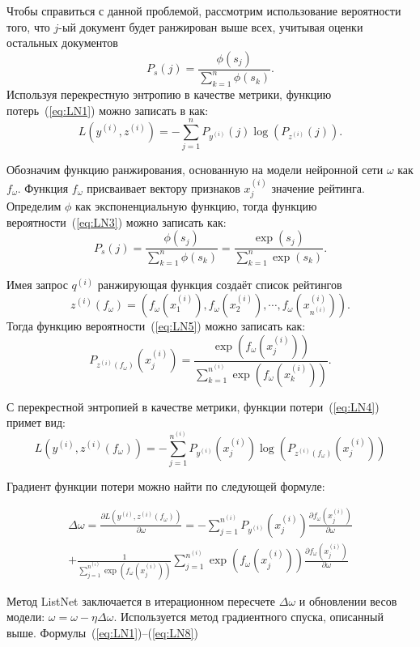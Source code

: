 Чтобы справиться с данной проблемой, рассмотрим использование вероятности того, что $j$-ый документ будет ранжирован выше всех, учитывая оценки остальных документов
\begin{equation}
	\label{eq:LN3}
	P_s(j)=\frac{\phi(s_j)}{\sum_{k=1}^n \phi(s_k)} .
\end{equation}
Используя перекрестную энтропию в качестве метрики, функцию потерь~(\ref{eq:LN1}) можно записать в как:
\begin{equation}
	\label{eq:LN4}
	L(y^{(i)}, z^{(i)})=-\sum_{j=1}^n P_{y^{(i)}}(j) \log (P_{z^{(i)}}(j)).
\end{equation}

Обозначим функцию ранжирования, основанную на модели нейронной сети $\omega$ как $f_\omega$. Функция $f_\omega$ присваивает вектору признаков $x_j^{(i)}$ значение рейтинга. Определим $\phi$ как экспоненциальную функцию, тогда функцию вероятности~(\ref{eq:LN3}) можно записать как:
\begin{equation}
	\label{eq:LN5}
	P_s(j)=\frac{\phi(s_j)}{\sum_{k=1}^n \phi(s_k)}=\frac{\exp (s_j)}{\sum_{k=1}^n \exp (s_k)}.
\end{equation}

Имея запрос $q^{(i)}$ ранжирующая функция создаёт список рейтингов \[z^{(i)}(f_\omega)=(f_\omega(x_1^{(i)}), f_\omega(x_2^{(i)}), \cdots, f_\omega(x_{n^{(i)}}^{(i)})).
\]
Тогда функцию вероятности~(\ref{eq:LN5}) можно записать как:
\begin{equation}
	\label{eq:LN6}
	P_{z^{(i)}(f_\omega)}(x_j^{(i)})=\frac{\exp (f_\omega(x_j^{(i)}))}{\sum_{k=1}^{n^{(i)}} \exp (f_\omega(x_k^{(i)}))}.
\end{equation}

С перекрестной энтропией в качестве метрики, функции потери~(\ref{eq:LN4}) примет вид:
\begin{equation}
	\label{eq:LN7}
	L(y^{(i)}, z^{(i)}(f_\omega))=-\sum_{j=1}^{n^{(i)}} P_{y^{(i)}}(x_j^{(i)}) \log (P_{z^{(i)}(f_\omega)}(x_j^{(i)}))
\end{equation}

Градиент функции потери можно найти по следующей формуле:

\begin{equation}
	\label{eq:LN8}
	\begin{aligned}
		\Delta \omega= 
		\frac{\partial L(y^{(i)}, z^{(i)}(f_\omega))}{\partial \omega}=-\sum_{j=1}^{n^{(i)}} P_{y^{(i)}}(x_j^{(i)}) \frac{\partial f_\omega(x_j^{(i)})}{\partial \omega} \\
		+\frac{1}{\sum_{j=1}^{n^{(i)}} \exp (f_\omega(x_j^{(i)}))} \sum_{j=1}^{n^{(i)}} \exp (f_\omega(x_j^{(i)})) \frac{\partial f_\omega(x_j^{(i)})}{\partial \omega}
	\end{aligned}
\end{equation}


Метод ListNet заключается в итерационном пересчете $\Delta \omega$ и обновлении весов модели: $\omega = \omega - \eta\Delta \omega$. Используется метод градиентного спуска, описанный выше. Формулы~(\ref{eq:LN1})--(\ref{eq:LN8})~\cite{ListNet}